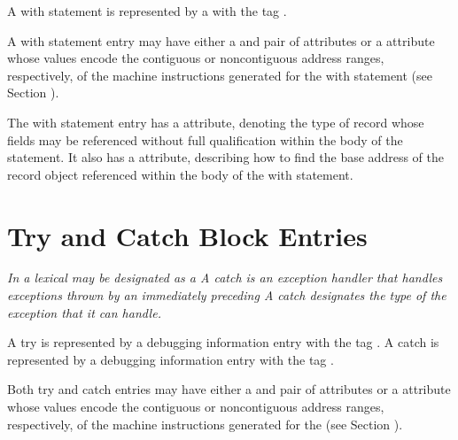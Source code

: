 A with statement is represented by a
with the tag .

A with statement entry may have either a 
 and
 pair of attributes 
or 
a  attribute
whose values encode the contiguous or non\dash contiguous address
ranges, respectively, of the machine instructions generated
for the with statement 
(see Section ).

The with statement entry has 
a  attribute, denoting
the type of record whose fields may be referenced without full
qualification within the body of the statement. It also has
a  attribute, describing how to find the base
address of the record object referenced within the body of
the with statement.

\section{Try and Catch Block Entries}
\label{chap:tryandcatchblockentries}

\textit{In  a lexical  may be 
designated as a  
A catch  is an 
exception handler that handles
exceptions thrown by an immediately 
preceding 
A catch  
designates the type of the exception that it
can handle.}

A try  is represented 
by a debugging information entry
with the tag .  
A catch  is represented by
a debugging information entry with 
the tag .

Both try and catch  entries may have either a
 and 
 pair of attributes 
or 
a
 attribute 
whose values encode the contiguous
or non\dash contiguous address ranges, respectively, of the
machine instructions generated for the 
(see Section
).

